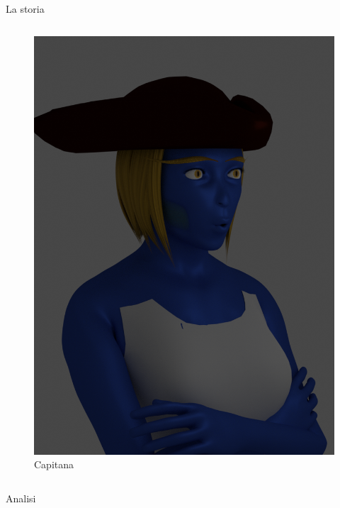 \documentclass[10pt]{beamer}
\begin{document}
\begin{frame}[fragile]{La storia}
\begin{columns}[T,onlytextwidth]
      \begin{figure}
          \centering
          \includegraphics[width=\textwidth]{figures/Capitana.png}
          \caption{Capitana}
      \end{figure}
  \end{columns}
\end{frame}

\begin{frame}{Analisi}
\end{frame}
\end{document}
